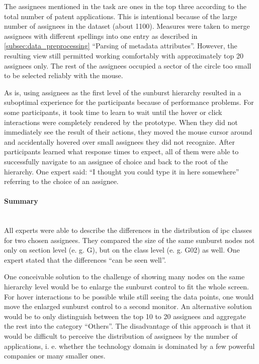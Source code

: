 The assignees mentioned in the task are ones in the top three according to the total number of patent applications.
This is intentional because of the large number of assignees in the dataset (about 1100).
Measures were taken to merge assignees with different spellings into one entry as described in \autoref{subsec:data_preprocessing} ``Parsing of metadata attributes''.
However, the resulting view still permitted working comfortably with approximately top 20 assignees only.
The rest of the assignees occupied a sector of the circle too small to be selected reliably with the mouse.

As is, using assignees as the first level of the sunburst hierarchy resulted in a suboptimal experience for the participants because of performance problems.
For some participants, it took time to learn to wait until the hover or click interactions were completely rendered by the prototype.
When they did not immediately see the result of their actions, they moved the mouse cursor around and accidentally hovered over small assignees they did not recognize.
After participants learned what response times to expect, all of them were able to successfully navigate to an assignee of choice and back to the root of the hierarchy.
One expert said: ``I thought you could type it in here somewhere'' referring to the choice of an assignee.

\paragraph{Summary}~\\
All experts were able to describe the differences in the distribution of \gls{ipc} classes for two chosen assignees.
They compared the size of the same sunburst nodes not only on section level (e. g. G), but on the class level (e. g. G02) as well.
One expert stated that the differences ``can be seen well''.

One conceivable solution to the challenge of showing many nodes on the same hierarchy level would be to enlarge the sunburst control to fit the whole screen. 
For hover interactions to be possible while still seeing the data points, one would move the enlarged sunburst control to a second monitor.
An alternative solution would be to only distinguish between the top 10 to 20 assignees and aggregate the rest into the category ``Others''.
The disadvantage of this approach is that it would be difficult to perceive the distribution of assignees by the number of applications, i. e. whether the technology domain is dominated by a few powerful companies or many smaller ones.

